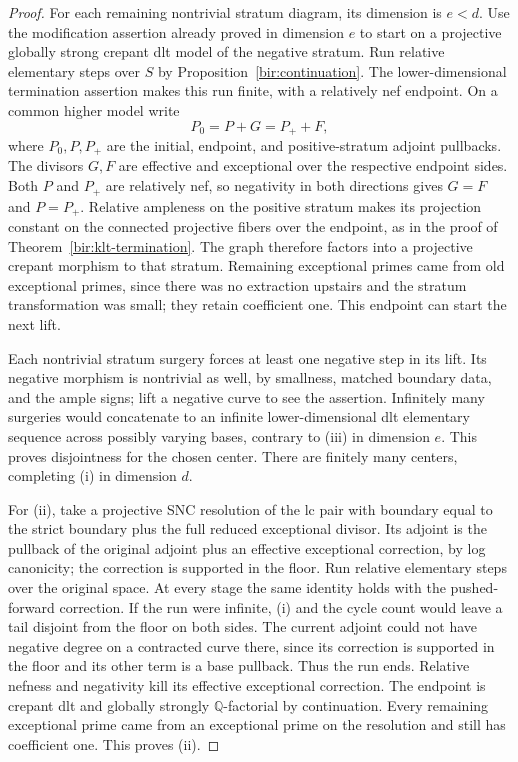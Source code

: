 \documentclass[11pt,letterpaper]{article}
\theoremstyle{definition}
\theoremstyle{remark}
\begin{document}
\begin{proof}
For each remaining nontrivial stratum diagram, its dimension is
$e<d$.  Use the modification assertion already proved in dimension
$e$ to start on a projective globally strong crepant dlt model of
the negative stratum.  Run relative elementary steps over $S$ by
Proposition~\ref{bir:continuation}.  The lower-dimensional
termination assertion makes this run finite, with a relatively nef
endpoint.  On a common higher model write
\begin{equation}
 P_0=P+G=P_++F,
 \label{bir:dlt-lift}
\end{equation}
where $P_0,P,P_+$ are the initial, endpoint, and positive-stratum
adjoint pullbacks.  The divisors $G,F$ are effective and exceptional
over the respective endpoint sides.  Both $P$ and $P_+$ are
relatively nef, so negativity in both directions gives $G=F$ and
$P=P_+$.  Relative ampleness on the positive stratum makes its
projection constant on the connected projective fibers over the
endpoint, as in the proof of Theorem~\ref{bir:klt-termination}.
The graph therefore factors into a projective crepant morphism to
that stratum.  Remaining exceptional primes came from old
exceptional primes, since there was no extraction upstairs and the
stratum transformation was small; they retain coefficient one.
This endpoint can start the next lift.

Each nontrivial stratum surgery forces at least one negative step
in its lift.  Its negative morphism is nontrivial as well, by
smallness, matched boundary data, and the ample signs; lift a
negative curve to see the assertion.  Infinitely many surgeries
would concatenate to an infinite lower-dimensional dlt elementary
sequence across possibly varying bases, contrary to (iii) in
dimension $e$.  This proves disjointness for the chosen center.
There are finitely many centers, completing (i) in dimension $d$.

For (ii), take a projective SNC resolution of the lc pair with
boundary equal to the strict boundary plus the full reduced
exceptional divisor.  Its adjoint is the pullback of the original
adjoint plus an effective exceptional correction, by log canonicity;
the correction is supported in the floor.  Run relative elementary
steps over the original space.  At every stage the same identity
holds with the pushed-forward correction.  If the run were
infinite, (i) and the cycle count would leave a tail disjoint from
the floor on both sides.  The current adjoint could not have
negative degree on a contracted curve there, since its correction
is supported in the floor and its other term is a base pullback.
Thus the run ends.  Relative nefness and negativity kill its
effective exceptional correction.  The endpoint is crepant dlt
and globally strongly $\mathbb{Q}$-factorial by continuation.  Every
remaining exceptional prime came from an exceptional prime on
the resolution and still has coefficient one.  This proves (ii).


\end{proof}
\end{document}
